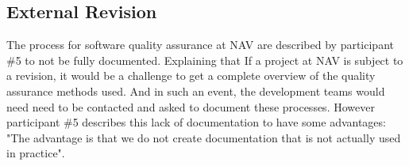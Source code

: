 




\subsection{External Revision}
The process for software quality assurance at NAV are described by participant \#5 to not be fully documented. Explaining that If a project at NAV is subject to a revision, it would be a challenge to get a complete overview of the quality assurance methods used. And in such an event, the development teams would need need to be contacted and asked to document these processes. However participant \#5 describes this lack of documentation to have some advantages: "The advantage is that we do not create documentation that is not actually used in practice".

